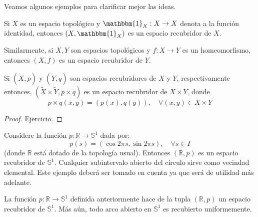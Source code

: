 \documentclass[12pt]{report}
\theoremstyle{largebreak}
\newcommand\cf[3]{\ensuremath{#1:#2\rightarrow#3}}
\newcommand{\bbm}[1]{\ensuremath{\mathbbm{#1}}}
\begin{document}
    Veamos algunos ejemplos para clarificar mejor las ideas.

    \begin{exa}
        Si $X$ es un espacio topológico y $\cf{\bbm{1}_X}{X}{X}$ denota a la función identidad, entonces $(X,\bbm{1}_X)$ es un espacio recubridor de $X$.
        
        Similarmente, si $X,Y$ son espacios topológicos y $\cf{f}{X}{Y}$ es un homeomorfismo, entonces $(X,f)$ es un espacio recubridor de $Y$.
    \end{exa}

    \begin{exa}
        Si $(\widetilde{X},p)$ y $(\widetilde{Y},q)$ son espacios recubridores de $X$ y $Y$, respectivamente entonces, $(\widetilde{X}\times\widetilde{Y},p\times q)$ es un espacio recubridor de $X\times Y$, donde
        \begin{equation*}
            p\times q(x,y)=(p(x),q(y)),\quad\forall (x,y)\in X\times Y
        \end{equation*}
    \end{exa}

    \begin{proof}
        Ejercicio.
    \end{proof}

    \begin{exa}
        Considere la función $\cf{p}{\mathbb{R}}{\mathbb{S}^1}$ dada por:
        \begin{equation*}
            p(s)=(\cos 2\pi s,\sin 2\pi s),\quad\forall s\in I
        \end{equation*}
        (donde $\mathbb{R}$ está dotado de la topología usual). Entonces $(\mathbb{R},p)$ es un espacio recubridor de $\mathbb{S}^1$. Cualquier subintervalo abierto del círculo sirve como vecindad elemental. Este ejemplo deberá ser tomado en cuenta ya que será de utilidad más adelante.
    \end{exa}

    \begin{propo}
        La función $\cf{p}{\mathbb{R}}{\mathbb{S}^1}$ definida anteriormente hace de la tupla $(\mathbb{R},p)$ un espacio recubridor de $\mathbb{S}^1$. Más aún, todo arco abierto en $\mathbb{S}^1$ es recubierto uniformemente.
    \end{propo}
\end{document}
